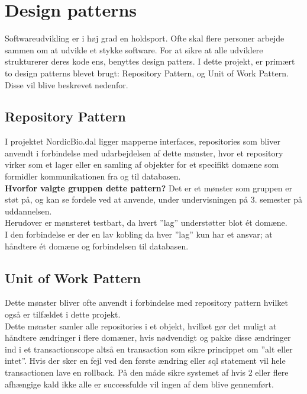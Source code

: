 \section{Design patterns}\label{designpatterns}
Softwareudvikling er i høj grad en holdsport. Ofte skal flere personer arbejde sammen om at udvikle et stykke software.
For at sikre at alle udviklere strukturerer deres kode ens, benyttes design patters. I dette projekt, er primært to design 
patterns blevet brugt: Repository Pattern, og Unit of Work Pattern. Disse vil blive beskrevet nedenfor.

\subsection{Repository Pattern}
I projektet NordicBio.dal ligger mapperne interfaces, repositories som bliver anvendt i forbindelse med udarbejdelsen af 
dette mønster, hvor et repository virker som et lager eller en samling af objekter for et specifikt domæne som formidler 
kommunikationen fra og til databasen. \\

\textbf{Hvorfor valgte gruppen dette pattern?}
Det er et mønster som gruppen er støt på, og kan se fordele ved at anvende, under undervisningen på 3. semester på uddannelsen. \\

Herudover er mønsteret testbart, da hvert ”lag” understøtter blot ét domæne. \\

I den forbindelse er der en lav kobling da hver ”lag” kun har et ansvar; at håndtere ét domæne og forbindelsen til databasen.

\subsection{Unit of Work Pattern}
Dette mønster bliver ofte anvendt i forbindelse med repository pattern hvilket også er tilfældet i dette projekt. \\

Dette mønster samler alle repositories i et objekt, hvilket gør det muligt at håndtere ændringer i flere domæner, 
hvis nødvendigt og pakke disse ændringer ind i et transactionscope altså en transaction som sikre princippet om ”alt eller intet”. 
Hvis der sker en fejl ved den første ændring eller sql statement vil hele transactionen lave en rollback. På den måde sikre systemet 
af hvis 2 eller flere afhængige kald ikke alle er successfulde vil ingen af dem blive gennemført.